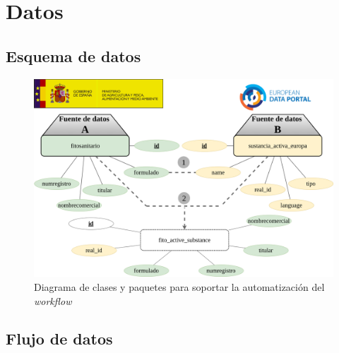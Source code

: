\chapter{Datos} \label{a.datos}

\section{Esquema de datos} \label{a.datos.modelo}

\begin{figure}[H]
    \centering
    \includegraphics[width=\textwidth,height=\textheight,keepaspectratio]{Imagenes/esquemadedatos}
    \caption{Diagrama de clases y paquetes para soportar la automatización del \textit{workflow}}
    \label{fig:diag_clases}
\end{figure}

\section{Flujo de datos} \label{a.datos.flujo}



\par